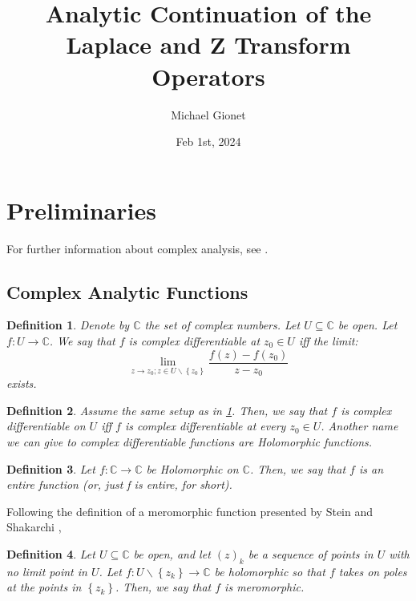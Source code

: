 \documentclass{article}
\title{Analytic Continuation of the Laplace and Z Transform Operators}
\author{Michael Gionet}
\date{Feb 1st, 2024}
\newtheorem{definition}{Definition}
\begin{document}
	\maketitle
	
	\section{Preliminaries}
	
	For further information about complex analysis, see \cite{steinComplexAnalysis}. 
	
	\subsection{Complex Analytic Functions}
	
	\begin{definition} \label{def_complex_diff_point}
		Denote by $\mathbb{C}$ the set of complex numbers. 
		Let $ U \subseteq \mathbb{C} $ be open. 
		Let $ f : U \rightarrow \mathbb{C} $. 
		We say that $f$ is complex differentiable at $z_0 \in U$ iff the limit:
		$$ \lim_{ z \rightarrow z_0; z \in U \backslash \left\{ z_0 \right\} } \frac{ f(z) - f(z_0) }{ z - z_0 } $$
		exists. 
	\end{definition}

	\begin{definition} \label{ def_complex_diff_domain }
		Assume the same setup as in \ref{def_complex_diff_point}. Then, we say that $f$ is complex differentiable on $U$ iff $f$ is complex differentiable at every $z_0 \in U$. Another name we can give to complex differentiable functions are Holomorphic functions. 
	\end{definition}

	\begin{definition} \label{ def_entire_function }
		Let $f : \mathbb{C} \rightarrow \mathbb{C}$ be Holomorphic on $\mathbb{C}$. Then, we say that $f$ is an entire function (or, just f is entire, for short).
	\end{definition}

	Following the definition of a meromorphic function presented by Stein and Shakarchi \cite{steinComplexAnalysis},
	\begin{definition} \label{ def_meromorphic }
		Let $U \subseteq \mathbb{C}$ be open, and let $(z)_k$ be a sequence of points in $U$ with no limit point in $U$. 
		Let $f : U \backslash \left\{z_k \right\} \rightarrow \mathbb{C} $ be holomorphic so that $f$ takes on poles at the points in $\left\{ z_k \right\}$. Then, we say that $f$ is meromorphic.
	\end{definition}
\end{document}
